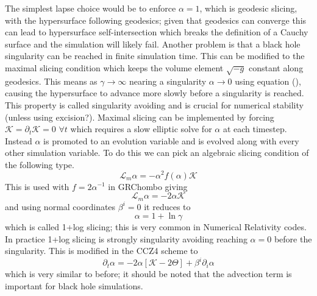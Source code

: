 \documentclass[11pt, oneside]{report}  %
\newcommand{\K}{\mathcal{K}}
\renewcommand{\L}{\mathcal{L}}
\numberwithin{equation}{section}
\begin{document}
The simplest lapse choice would be to enforce $\alpha=1$, which is geodesic slicing, with the hypersurface following geodesics; given that geodesics can converge this can lead to hypersurface self-intersection which breaks the definition of a Cauchy surface and the simulation will likely fail. Another problem is that a black hole singularity can be reached in finite simulation time. This can be modified to the maximal slicing condition which keeps the volume element $\sqrt{-g}$ constant along geodesics. This means as $\gamma\rightarrow\infty$ nearing a singularity $\alpha\rightarrow0$ using equation (), causing the hypersurface to advance more slowly before a singularity is reached. This property is called singularity avoiding and is crucial for numerical stability (unless using excision?). 
Maximal slicing can be implemented by forcing $\mathcal{K} = \partial_t \K = 0$ $\forall t$ which requires a slow elliptic solve for $\alpha$ at each timestep. Instead $\alpha$ is promoted to an evolution variable and is evolved along with every other simulation variable. To do this we can pick an algebraic slicing condition of the following type.
\begin{equation}\L_m \alpha = -\alpha^2 f(\alpha)\K \end{equation}
This is used with $f = 2\alpha^{-1}$ in GRChombo giving
\begin{equation}\L_m \alpha = -2\alpha \K \end{equation}
and using normal coordinates $\beta^i=0$ it reduces to 
\begin{equation} \alpha = 1+ \ln \gamma\end{equation}
which is called 1+log slicing; this is very common in Numerical Relativity codes. In practice 1+log slicing is strongly singularity avoiding reaching $\alpha=0$ before the singularity. This is modified in the CCZ4 scheme to 
\begin{equation}\partial_t \alpha = -2\alpha\left[ \K-2\Theta\right] + \beta^i \partial_i \alpha\end{equation}
which is very similar to before; it should be noted that the advection term is important for black hole simulations.
\end{document}
